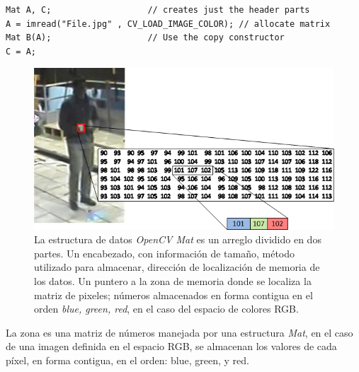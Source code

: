 \renewcommand{\lstlistingname}{Código}

\begin{lstlisting}[caption={Ejemplo de uso estructura MAT},label=MATLabel]
Mat A, C;                   // creates just the header parts
A = imread("File.jpg" , CV_LOAD_IMAGE_COLOR); // allocate matrix
Mat B(A);                   // Use the copy constructor
C = A;    
\end{lstlisting}

\begin{figure}[h!]
\centering
\includegraphics[scale=0.6]{img/ch5/opencv_mat}
\caption[Estructura de datos \textit{OpenCV Mat} ]{La estructura de datos \textit{OpenCV Mat} es un arreglo dividido en dos partes. Un encabezado, con información de tamaño, método utilizado para almacenar, dirección de localización de memoria de los datos. Un puntero a la zona de memoria donde se localiza la matriz de pixeles; números almacenados en forma contigua en el orden \textit{blue, green, red}, en el caso del espacio de colores RGB.}
\label{fig:mat}
\end{figure}

La zona es una matriz de números manejada por una estructura \textit{Mat}, en el caso de una imagen definida en el espacio RGB, se almacenan los valores de cada píxel, en forma contigua, en el orden: blue, green, y red.


